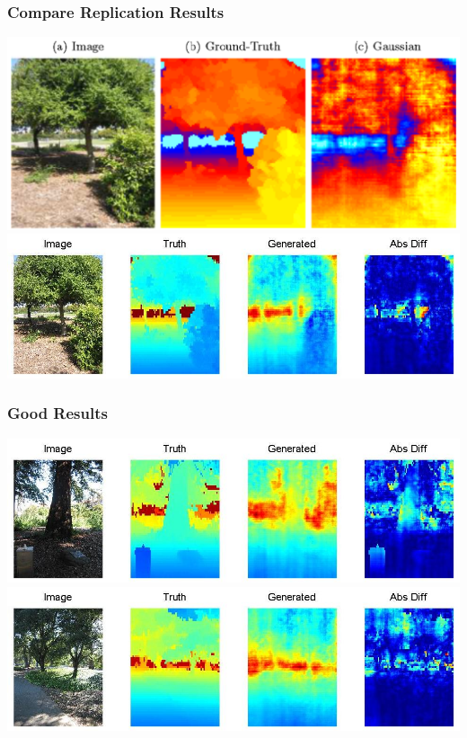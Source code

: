 \documentclass[handout]{beamer}
\begin{document}
\begin{frame}[t]\frametitle{Compare Replication Results}
    \includegraphics[width=\linewidth]{compare2.png} \\
    \vfill\includegraphics[width=\linewidth]{compare2.jpg}
\end{frame}

\begin{frame}[t]\frametitle{Good Results}
    \includegraphics[width=\linewidth]{good1.jpg} \\
    \vfill\includegraphics[width=\linewidth]{good2.jpg}
\end{frame}
\end{document}
